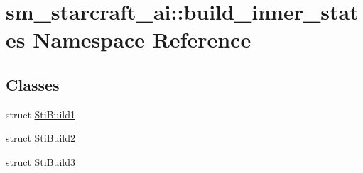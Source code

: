 \hypertarget{namespacesm__starcraft__ai_1_1build__inner__states}{}\section{sm\+\_\+starcraft\+\_\+ai\+:\+:build\+\_\+inner\+\_\+states Namespace Reference}
\label{namespacesm__starcraft__ai_1_1build__inner__states}
\subsection*{Classes}
\begin{DoxyCompactItemize}
\item 
struct \hyperlink{structsm__starcraft__ai_1_1build__inner__states_1_1StiBuild1}{Sti\+Build1}
\item 
struct \hyperlink{structsm__starcraft__ai_1_1build__inner__states_1_1StiBuild2}{Sti\+Build2}
\item 
struct \hyperlink{structsm__starcraft__ai_1_1build__inner__states_1_1StiBuild3}{Sti\+Build3}
\end{DoxyCompactItemize}

